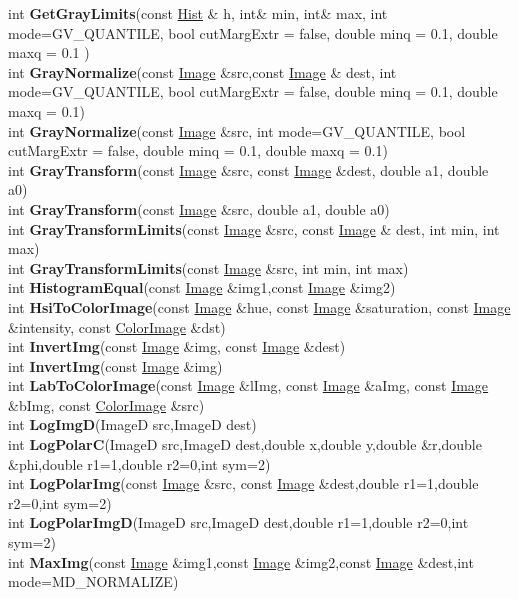\documentclass[10pt,titlepage]{article}
\def\functionlistentry#1#2#3#4#5#6{\noindent #1 {\bf #2}(#3) \dotfill #6\\}
\begin{document}
{{\functionlistentry{int}{GetGrayLimits}{const \hyperlink{Hist}{Hist} \& h, int\& min, int\& max, int mode=GV\_QUANTILE, bool cutMargExtr = false, double minq = 0.1, double maxq = 0.1 }{1073}{processing}{}
\functionlistentry{int}{GrayNormalize}{const \hyperlink{Image}{Image} \&src,const \hyperlink{Image}{Image} \& dest, int mode=GV\_QUANTILE, bool cutMargExtr = false, double minq = 0.1, double maxq = 0.1}{1078}{processing}{}
\functionlistentry{int}{GrayNormalize}{const \hyperlink{Image}{Image} \&src, int mode=GV\_QUANTILE, bool cutMargExtr = false, double minq = 0.1, double maxq = 0.1}{1079}{processing}{}
\functionlistentry{int}{GrayTransform}{const \hyperlink{Image}{Image} \&src, const \hyperlink{Image}{Image} \&dest, double a1, double a0}{1074}{processing}{}
\functionlistentry{int}{GrayTransform}{const \hyperlink{Image}{Image} \&src, double a1, double a0}{1075}{processing}{}
\functionlistentry{int}{GrayTransformLimits}{const \hyperlink{Image}{Image} \&src, const \hyperlink{Image}{Image} \& dest, int min, int max}{1076}{processing}{}
\functionlistentry{int}{GrayTransformLimits}{const \hyperlink{Image}{Image} \&src, int min, int max}{1077}{processing}{}
\functionlistentry{int}{HistogramEqual}{const \hyperlink{Image}{Image} \&img1,const \hyperlink{Image}{Image} \&img2}{1080}{processing}{}
\functionlistentry{int}{HsiToColorImage}{const \hyperlink{Image}{Image} \&hue, const \hyperlink{Image}{Image} \&saturation, const \hyperlink{Image}{Image} \&intensity, const \hyperlink{ColorImage}{ColorImage} \&dst}{1108}{processing}{}
\functionlistentry{int}{InvertImg}{const \hyperlink{Image}{Image} \&img, const \hyperlink{Image}{Image} \&dest}{1092}{processing}{}
\functionlistentry{int}{InvertImg}{const \hyperlink{Image}{Image} \&img}{1093}{processing}{}
\functionlistentry{int}{LabToColorImage}{const \hyperlink{Image}{Image} \&lImg, const \hyperlink{Image}{Image} \&aImg, const \hyperlink{Image}{Image} \&bImg, const \hyperlink{ColorImage}{ColorImage} \&src}{1110}{processing}{}
\functionlistentry{int}{LogImgD}{ImageD src,ImageD dest}{1100}{processing}{}
\functionlistentry{int}{LogPolarC}{ImageD src,ImageD dest,double x,double y,double \&r,double \&phi,double r1=1,double r2=0,int sym=2}{1106}{processing}{}
\functionlistentry{int}{LogPolarImg}{const \hyperlink{Image}{Image} \&src, const \hyperlink{Image}{Image} \&dest,double r1=1,double r2=0,int sym=2}{1105}{processing}{}
\functionlistentry{int}{LogPolarImgD}{ImageD src,ImageD dest,double r1=1,double r2=0,int sym=2}{1104}{processing}{}
\functionlistentry{int}{MaxImg}{const \hyperlink{Image}{Image} \&img1,const \hyperlink{Image}{Image} \&img2,const \hyperlink{Image}{Image} \&dest,int mode=MD\_NORMALIZE}{1090}{processing}{}
}}
\end{document}

